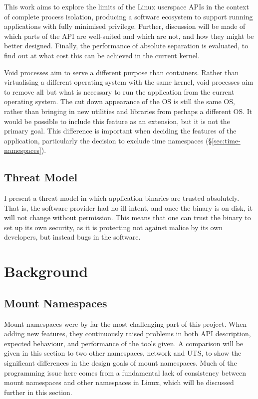 \documentclass[sigplan]{acmart}
\begin{document}
This work aims to explore the limits of the Linux userspace APIs in the context of complete process isolation, producing a software ecosystem to support running applications with fully minimised privilege. Further, discussion will be made of which parts of the API are well-suited and which are not, and how they might be better designed. Finally, the performance of absolute separation is evaluated, to find out at what cost this can be achieved in the current kernel.

Void processes aim to serve a different purpose than containers. Rather than virtualising a different operating system with the same kernel, void processes aim to remove all but what is necessary to run the application from the current operating system. The cut down appearance of the OS is still the same OS, rather than bringing in new utilities and libraries from perhaps a different OS. It would be possible to include this feature as an extension, but it is not the primary goal. This difference is important when deciding the features of the application, particularly the decision to exclude time namespaces (§\ref{sec:time-namespaces}).

\subsection{Threat Model}
\label{section:threat-model}

I present a threat model in which application binaries are trusted absolutely. That is, the software provider had no ill intent, and once the binary is on disk, it will not change without permission. This means that one can trust the binary to set up its own security, as it is protecting not against malice by its own developers, but instead bugs in the software.


\section{Background}

\subsection{Mount Namespaces}

Mount namespaces were by far the most challenging part of this project. When adding new features, they continuously raised problems in both API description, expected behaviour, and performance of the tools given. A comparison will be given in this section to two other namespaces, network and UTS, to show the significant differences in the design goals of mount namespaces. Much of the programming issue here comes from a fundamental lack of consistency between mount namespaces and other namespaces in Linux, which will be discussed further in this section.
\end{document}
